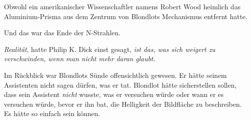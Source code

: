 Obwohl ein amerikanischer Wissenschaftler namens Robert Wood heimlich das Aluminium-Prisma aus dem Zentrum von Blondlots Mechanismus entfernt hatte.

Und das war das Ende der N-Strahlen.

\emph{Realität}, hatte Philip K. Dick einst gesagt, \emph{ist das, was sich weigert zu verschwinden, wenn man nicht mehr daran glaubt.}

Im Rückblick war Blondlots Sünde offensichtlich gewesen. Er hätte seinem Assistenten nicht sagen dürfen, was er tat. Blondlot hätte sicherstellen sollen, dass sein Assistent \emph{nicht} wusste, was er versuchen würde oder wann er es versuchen würde, bevor er ihn bat, die Helligkeit der Bildfläche zu beschreiben. Es hätte so einfach sein können.

